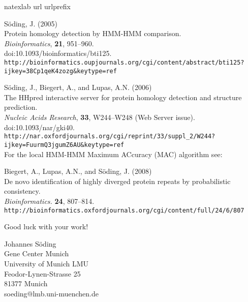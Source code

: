 \documentclass[11pt,a4paper]{article}
\begin{document}
\begin{thebibliography}{31}

\expandafter\ifx\csname natexlab\endcsname\relax\def\natexlab#1{#1}\fi
\expandafter\ifx\csname url\endcsname\relax
  \def\url#1{\texttt{#1}}\fi
\expandafter\ifx\csname urlprefix\endcsname\relax\def\urlprefix{URL }\fi

S\"oding, J. (2005)\\
{Protein homology detection by HMM-HMM comparison.}\\
\newblock \emph{Bioinformatics}, \textbf{21}, 951--960.\\
\newblock doi:10.1093/bioinformatics/bti125.\\
\newblock \url{http://bioinformatics.oupjournals.org/cgi/content/abstract/bti125?ijkey=38Cp1qeK4zozg&keytype=ref}

S\"oding, J., Biegert, A., and Lupas, A.N. (2006)\\
{The HHpred interactive server for protein homology detection and structure prediction.}\\
\newblock \emph{Nucleic Acids Research}, \textbf{33}, W244--W248 (Web Server issue).\\
\newblock doi:10.1093/nar/gki40.\\
\newblock \url{http://nar.oxfordjournals.org/cgi/reprint/33/suppl_2/W244?ijkey=FuurmQ3jgumZ6AU&keytype=ref}\\[1mm]

\noindent For the local HMM-HMM Maximum ACcuracy (MAC) algorithm see:

Biegert, A., Lupas, A.N., and S\"oding, J. (2008)\\
{De novo identification of highly diverged protein repeats by probabilistic consistency.}\\
\newblock \emph{Bioinformatics.} \textbf{24}, 807--814.\\
\newblock \url{http://bioinformatics.oxfordjournals.org/cgi/content/full/24/6/807}

\end{thebibliography}

\vspace{20mm}
\begin{center}
Good luck with your work!

\vspace{5mm}
Johannes S\"oding\\[2mm]
Gene Center Munich\\
University of Munich {LMU}\\
Feodor-Lynen-Strasse 25\\
81377 Munich\\
soeding@lmb.uni-muenchen.de\\
\end{center}
\end{document}
